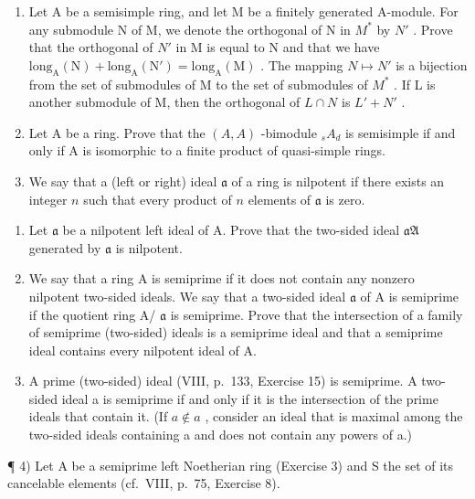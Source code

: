 
\begin{enumerate}
\def\labelenumi{\arabic{enumi})}
\item
  Let A be a semisimple ring, and let M be a finitely generated A-module. For any submodule N of M, we denote the orthogonal of N in \(M^{*}\) by \(N'\) . Prove that the orthogonal of \(N'\) in M is equal to N and that we have \(\text{long}_{\text{A}}(\text{N}) + \text{long}_{\text{A}}(\text{N}') = \text{long}_{\text{A}}(\text{M})\) . The mapping \(N \mapsto N'\) is a bijection from the set of submodules of M to the set of submodules of \(M^{*}\) . If L is another submodule of M, then the orthogonal of \(L \cap N\) is \(L' + N'\) .
\item
  Let A be a ring. Prove that the \((A,A)\) -bimodule \(_{s}A_{d}\) is semisimple if and only if A is isomorphic to a finite product of quasi-simple rings.
\item
  We say that a (left or right) ideal \(\mathfrak{a}\) of a ring is nilpotent if there exists an integer \(n\) such that every product of \(n\) elements of \(\mathfrak{a}\) is zero.
\end{enumerate}

\begin{enumerate}
\def\labelenumi{\alph{enumi})}
\item
  Let \(\mathfrak{a}\) be a nilpotent left ideal of A. Prove that the two-sided ideal \(\mathfrak{aA}\) generated by \(\mathfrak{a}\) is nilpotent.
\item
  We say that a ring A is semiprime if it does not contain any nonzero nilpotent two-sided ideals. We say that a two-sided ideal \(\mathfrak{a}\) of A is semiprime if the quotient ring A/ \(\mathfrak{a}\) is semiprime. Prove that the intersection of a family of semiprime (two-sided) ideals is a semiprime ideal and that a semiprime ideal contains every nilpotent ideal of A.
\item
  A prime (two-sided) ideal (VIII, p.~133, Exercise 15) is semiprime. A two-sided ideal a is semiprime if and only if it is the intersection of the prime ideals that contain it. (If \(a \notin a\) , consider an ideal that is maximal among the two-sided ideals containing a and does not contain any powers of a.)
\end{enumerate}

¶ 4) Let A be a semiprime left Noetherian ring (Exercise 3) and S the set of its cancelable elements (cf.~VIII, p.~75, Exercise 8).

